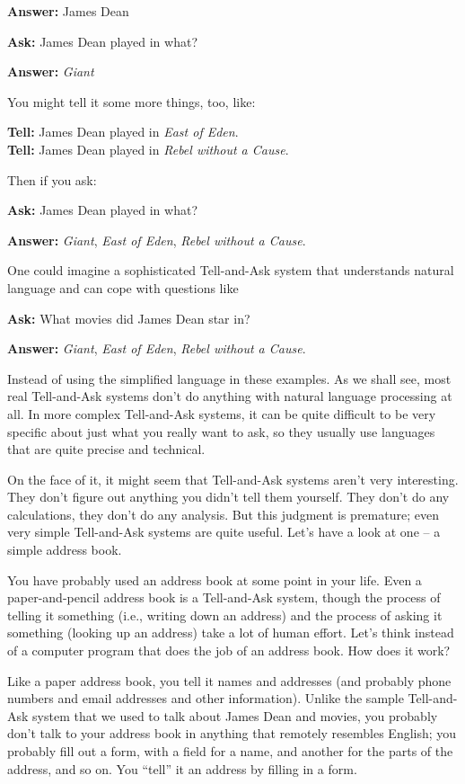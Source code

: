 \textbf{Answer:} James Dean

\textbf{Ask:} James Dean played in what?

\textbf{Answer:} \emph{Giant}

You might tell it some more things, too, like:

\textbf{Tell:} James Dean played in \emph{East of Eden}. \\
\textbf{Tell:} James Dean played in \emph{Rebel without a Cause}.

Then if you ask:

\textbf{Ask:} James Dean played in what?

\textbf{Answer:} \emph{Giant}, \emph{East of Eden}, \emph{Rebel without a Cause}.

One could imagine a sophisticated Tell-and-Ask system that understands
natural language and can cope with questions like

\textbf{Ask:} What movies did James Dean star in?

\textbf{Answer:} \emph{Giant}, \emph{East of Eden}, \emph{Rebel without a Cause}.

Instead of using the simplified language in these examples. As we shall
see, most real Tell-and-Ask systems don't do anything with natural
language processing at all. In more complex Tell-and-Ask 
systems, it can be quite difficult to be very specific about just what
you really want to ask, so they usually use languages that are quite
precise and technical.

On the face of it, it might seem that Tell-and-Ask systems aren't very
interesting. They don't figure out anything you didn't tell them
yourself. They don't do any calculations, they don't do any analysis.
But this judgment is premature; even very simple Tell-and-Ask systems
are quite useful. Let's have a look at one -- a simple address book.

You have probably used an address book at some point in your life. Even
a paper-and-pencil 
address book is a Tell-and-Ask system, though the process of telling it
something (i.e., writing down an address) and the process of asking it
something (looking up an address) take a lot of human effort. Let's
think instead of a computer program that does the job of an address
book. How does it work?

Like a paper address book, you tell it names and addresses (and probably
phone numbers and email addresses and other information). Unlike the
sample Tell-and-Ask system that we used to talk about James Dean and
movies, you probably don't talk to your address book in anything that
remotely resembles English; you probably fill out a form, with a field
for a name, and another for the parts of the address, and so on. You
``tell'' it an address by filling in a form.

